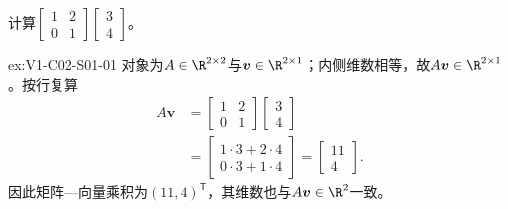 \begin{SLChapterExercisePairSection}

\begin{exercise}[矩阵乘法]\label{ex:V1-C02-S01-01}
计算$\begin{bmatrix}1&2\\0&1\end{bmatrix}\begin{bmatrix}3\\4\end{bmatrix}$。
\end{exercise}
\label{sol:V1-C02-S01-01}
\begin{chapterexercisesolution}{ex:V1-C02-S01-01}
对象为$A\in\R^{2\times2}$与$\boldsymbol v\in\R^{2\times1}$；内侧维数相等，故$A\boldsymbol v\in\R^{2\times1}$。按行复算
\[
\begin{aligned}
A\boldsymbol v
&=\begin{bmatrix}1&2\\0&1\end{bmatrix}
  \begin{bmatrix}3\\4\end{bmatrix}\\
&=\begin{bmatrix}1\cdot3+2\cdot4\\0\cdot3+1\cdot4\end{bmatrix}
=\begin{bmatrix}11\\4\end{bmatrix}.
\end{aligned}
\]
因此矩阵—向量乘积为$(11,4)^{\mathsf T}$，其维数也与$A\boldsymbol v\in\R^2$一致。
\end{chapterexercisesolution}


\end{SLChapterExercisePairSection}
